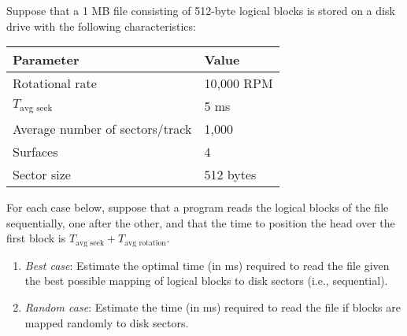 \documentclass[12pt]{article}
\newenvironment{ex}[2][Exercise]{\begin{trivlist}
		\item[\hskip \labelsep {\bfseries #1}\hskip \labelsep {\bfseries #2.}]}{\end{trivlist}}
\begin{document}
\begin{ex}{6.4}
	Suppose that a 1 MB file consisting of 512-byte logical blocks is stored on a disk drive with
	the following characteristics:
	\begin{center}
		\begin{tabular}{ll}
			Parameter & Value\\
			\hline
			Rotational rate & 10,000 RPM\\
			$T_{\text{avg seek}}$ & 5 ms\\
			Average number of sectors/track & 1,000\\
			Surfaces & 4\\
			Sector size & 512 bytes
		\end{tabular}
	\end{center}
	For each case below, suppose that a program reads the logical blocks of the file sequentially,
	one after the other, and that the time to position the head over the first block is
	$T_{\text{avg seek}} + T_{\text{avg rotation}}$.
	\begin{enumerate}[label=(\alph*)]
		\item \emph{Best case}: Estimate the optimal time (in ms) required to read the file given
		the best possible mapping of logical blocks to disk sectors (i.e., sequential).
		\item \emph{Random case}: Estimate the time (in ms) required to read the file if blocks
		are mapped randomly to disk sectors.
	\end{enumerate}
\end{ex}
\end{document}
